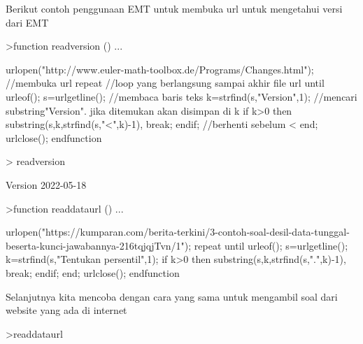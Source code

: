 \documentclass[a4paper,10pt]{article}
\begin{document}
\begin{eulernotebook}
\begin{eulercomment}
\begin{eulercomment}
\begin{eulercomment}
\begin{eulercomment}
\begin{eulercomment}
\begin{eulercomment}
\begin{eulercomment}
\begin{eulercomment}
\begin{eulercomment}
\begin{eulercomment}
\begin{eulercomment}
\begin{eulercomment}
\begin{eulercomment}
Berikut contoh penggunaan EMT untuk membuka url untuk mengetahui versi
dari EMT
\end{eulercomment}
\begin{eulerprompt}
>function readversion () ...
\end{eulerprompt}
\begin{eulerudf}
  urlopen("http://www.euler-math-toolbox.de/Programs/Changes.html"); //membuka url
  repeat //loop yang berlangsung sampai akhir file url
  until urleof();
  s=urlgetline();  //membaca baris teks
  k=strfind(s,"Version",1);  //mencari substring"Version". jika ditemukan akan disimpan di k
  if k>0 then substring(s,k,strfind(s,"<",k)-1), break; endif; //berhenti sebelum <
  end;
  urlclose();
  endfunction
\end{eulerudf}
\begin{eulerprompt}
> readversion
\end{eulerprompt}
\begin{euleroutput}
  Version 2022-05-18
\end{euleroutput}
\begin{eulerprompt}
>function readdataurl () ...
\end{eulerprompt}
\begin{eulerudf}
  urlopen("https://kumparan.com/berita-terkini/3-contoh-soal-desil-data-tunggal-beserta-kunci-jawabannya-216tqjqjTvn/1");
  repeat
  until urleof();
  s=urlgetline();
  k=strfind(s,"Tentukan persentil",1);
  if k>0 then substring(s,k,strfind(s,".",k)-1), break; endif;
  end;
  urlclose();
  endfunction
\end{eulerudf}
\begin{eulercomment}
Selanjutnya kita mencoba dengan cara yang sama untuk mengambil soal
dari website yang ada di internet
\end{eulercomment}
\begin{eulerprompt}
>readdataurl
\end{eulerprompt}
\begin{eulerudf}
  

\end{eulerudf}
\end{eulercomment}
\end{eulercomment}
\end{eulercomment}
\end{eulercomment}
\end{eulercomment}
\end{eulercomment}
\end{eulercomment}
\end{eulercomment}
\end{eulercomment}
\end{eulercomment}
\end{eulercomment}
\end{eulercomment}
\end{eulernotebook}
\end{document}
